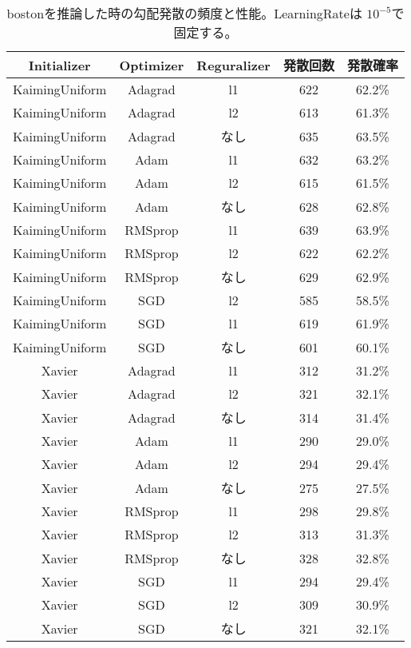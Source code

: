 \begin{table}[htbp]
    \begin{center}
        \caption{bostonを推論した時の勾配発散の頻度と性能。LearningRateは $ 10^{-5} $で固定する。 }
        \label{appendix:errorcount_table}
        \vspace{2mm} 
        \begin{tabular}{ |c|c|c|c|c| }
        \hline
        Initializer & Optimizer &  Reguralizer & 発散回数 & 発散確率 \\
        \hline
        KaimingUniform & Adagrad & l1 & 622 & 62.2\% \\
        \hline
        KaimingUniform & Adagrad & l2 & 613 & 61.3\% \\
        \hline
        KaimingUniform & Adagrad & なし & 635 & 63.5\% \\
        \hline
        KaimingUniform & Adam & l1 & 632 & 63.2\% \\
        \hline
        KaimingUniform & Adam & l2 & 615 & 61.5\% \\
        \hline
        KaimingUniform & Adam & なし & 628 & 62.8\% \\
        \hline
        KaimingUniform & RMSprop & l1 & 639 & 63.9\% \\
        \hline
        KaimingUniform & RMSprop & l2 & 622 & 62.2\% \\
        \hline
        KaimingUniform & RMSprop & なし & 629 & 62.9\% \\
        \hline
        KaimingUniform & SGD & l2 & 585 & 58.5\% \\
        \hline
        KaimingUniform & SGD & l1 & 619 & 61.9\% \\
        \hline
        KaimingUniform & SGD & なし & 601 & 60.1\% \\
        \hline
        Xavier & Adagrad & l1 & 312 & 31.2\% \\
        \hline
        Xavier & Adagrad & l2 & 321 & 32.1\% \\
        \hline
        Xavier & Adagrad & なし & 314 & 31.4\% \\
        \hline
        Xavier & Adam & l1 & 290 & 29.0\% \\
        \hline
        Xavier & Adam & l2 & 294 & 29.4\% \\
        \hline
        Xavier & Adam & なし & 275 & 27.5\% \\
        \hline
        Xavier & RMSprop & l1 & 298 & 29.8\% \\
        \hline
        Xavier & RMSprop & l2 & 313 & 31.3\% \\
        \hline
        Xavier & RMSprop & なし & 328 & 32.8\% \\
        \hline
        Xavier & SGD & l1 & 294 & 29.4\% \\
        \hline
        Xavier & SGD & l2 & 309 & 30.9\% \\
        \hline
        Xavier & SGD & なし & 321 & 32.1\% \\
        \hline
        \end{tabular}
    \end{center}
\end{table}
